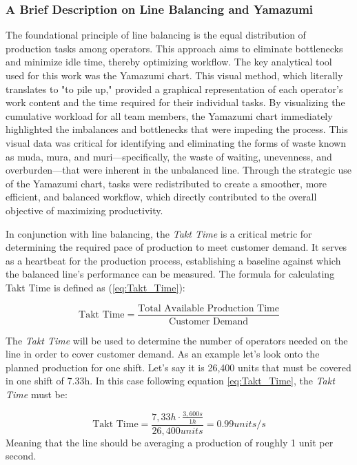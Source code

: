 \documentclass[]{article}
\begin{document}
\subsubsection{A Brief Description on Line Balancing and Yamazumi}
The foundational principle of line balancing is the equal distribution of production tasks among operators. This approach aims to eliminate bottlenecks and minimize idle time, thereby optimizing workflow. The key analytical tool used for this work was the Yamazumi chart. This visual method, which literally translates to "to pile up," provided a graphical representation of each operator's work content and the time required for their individual tasks. By visualizing the cumulative workload for all team members, the Yamazumi chart immediately highlighted the imbalances and bottlenecks that were impeding the process. This visual data was critical for identifying and eliminating the forms of waste known as muda, mura, and muri—specifically, the waste of waiting, unevenness, and overburden—that were inherent in the unbalanced line. Through the strategic use of the Yamazumi chart, tasks were redistributed to create a smoother, more efficient, and balanced workflow, which directly contributed to the overall objective of maximizing productivity.

In conjunction with line balancing, the \textit{Takt Time} is a critical metric for determining the required pace of production to meet customer demand. It serves as a heartbeat for the production process, establishing a baseline against which the balanced line's performance can be measured. The formula for calculating Takt Time is defined as (\ref{eq:Takt_Time}):

\begin{equation}\label{eq:Takt_Time}
\text{Takt Time} = \frac{\text{Total Available Production Time}}{\text{Customer Demand}}
\end{equation}

The \textit{Takt Time} will be used to determine the number of operators needed on the line in order to cover customer demand.
As an example let's look onto the planned production for one shift. Let's say it is 26,400 units that must be covered in one shift of 7.33h. In this case following equation \ref{eq:Takt_Time}, the \textit{Takt Time} must be:

\begin{equation}\label{eq:Takt_Time_example}
  \text{Takt Time} = \frac{7,33 h \cdot \frac{3,600 s}{1 h}}{26,400 units} = 0.99 units / s 
\end{equation}
Meaning that the line should be averaging a production of roughly 1 unit per second.
\end{document}
